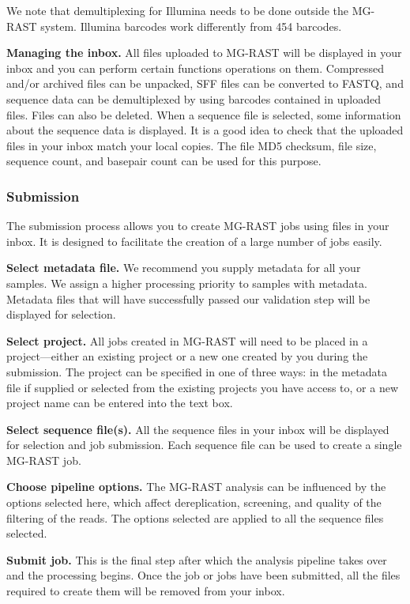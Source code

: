 \documentclass[12pt,fullpage]{report}
\begin{document}
We note that demultiplexing for Illumina needs to be done outside the MG-RAST system. Illumina barcodes work differently from 454 barcodes.

\noindent
\textbf{Managing the inbox.}
All files uploaded to MG-RAST will be displayed in your inbox and you can perform certain functions operations on them. Compressed and/or archived files can be unpacked, SFF files can be converted to FASTQ, and sequence data can be demultiplexed by using barcodes contained in uploaded files. Files can also be deleted. When a sequence file is selected, some information about the sequence data is displayed. It is a good idea to check that the uploaded files in your inbox match your local copies. The file \gls{MD5} checksum, file size, sequence count, and basepair count can be used for this purpose.
\subsubsection{Submission}
The submission process allows you to create MG-RAST jobs using files in your inbox. It is designed to facilitate the creation of a large number of jobs easily.

\textbf{Select metadata file.}
We recommend you supply metadata for all your samples. We assign a higher processing priority to samples with metadata. Metadata files that will have successfully passed our validation step will be displayed for selection.

\textbf{Select project.}
All jobs created in MG-RAST will need to be placed in a project---either an existing project or a new one created by you during the submission. The project can be specified in one of three ways: in the metadata file if supplied or selected from the existing projects you have access to, or a new project name can be entered into the text box.

\textbf{Select sequence file(s).}
All the sequence files in your inbox will be displayed for selection and job submission. Each sequence file can be used to create a single MG-RAST job.

\textbf{Choose pipeline options.}
The MG-RAST analysis can be influenced by the options selected here, which affect dereplication, screening, and quality of the filtering of the reads. The options selected are applied to all the sequence files selected.

\textbf{Submit job.}
This is the final step after which the analysis pipeline takes over and the processing begins. Once the job or jobs have been submitted, all the files required to create them will be removed from your inbox.
\end{document}
